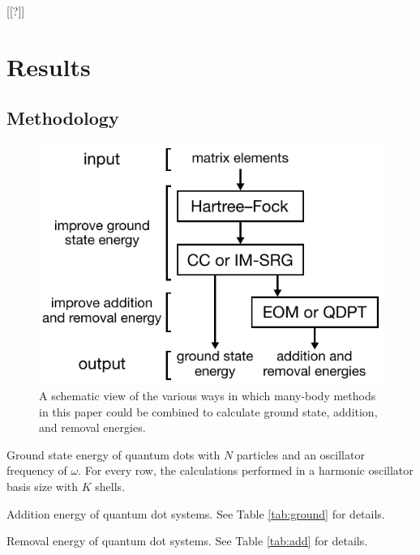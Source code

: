 [[?]]

\section{Results}
\label{sec:results}

\subsection{Methodology}
\label{subsec:methodology}

\begin{figure}
  \centering
  \includegraphics{figures/fig-methods}
  \caption{A schematic view of the various ways in which many-body methods in this paper could be combined to calculate ground state, addition, and removal energies.}
  \label{fig:methods}
\end{figure}

\begin{table}
  \centering
  \caption{Ground state energy of quantum dots with $N$ particles and an oscillator frequency of $\omega$.  For every row, the calculations performed in a harmonic oscillator basis size with $K$ shells.}
  \label{tab:ground}
  
\end{table}

\begin{table}
  \centering
  \caption{Addition energy of quantum dot systems.  See Table \ref{tab:ground} for details.}
  \label{tab:add}
  
\end{table}

\begin{table}
  \centering
  \caption{Removal energy of quantum dot systems.  See Table \ref{tab:add} for details.}
  \label{tab:rm}
  
\end{table}

